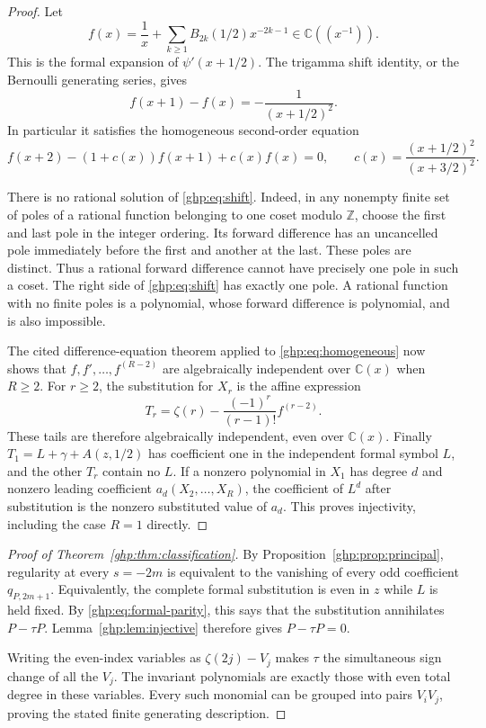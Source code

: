 \begin{proof}
Let
\begin{equation}\label{ghp:eq:formal-trigamma}
 f(x)=\frac1x+\sum_{k\geq1}B_{2k}(1/2)x^{-2k-1}
        \in\mathbb C((x^{-1})).
\end{equation}
This is the formal expansion of $\psi'(x+1/2)$. The trigamma shift
identity, or the Bernoulli generating series, gives
\begin{equation}\label{ghp:eq:shift}
 f(x+1)-f(x)=-\frac1{(x+1/2)^2}.
\end{equation}
In particular it satisfies the homogeneous second-order equation
\begin{equation}\label{ghp:eq:homogeneous}
 f(x+2)-(1+c(x))f(x+1)+c(x)f(x)=0,
 \qquad c(x)=\frac{(x+1/2)^2}{(x+3/2)^2}.
\end{equation}

There is no rational solution of \eqref{ghp:eq:shift}. Indeed, in any
nonempty finite set of poles of a rational function belonging to one
coset modulo $\mathbb Z$, choose the first and last pole in the integer
ordering. Its forward difference has an uncancelled pole immediately
before the first and another at the last. These poles are distinct.
Thus a rational forward difference cannot have precisely one pole in
such a coset. The right side of \eqref{ghp:eq:shift} has exactly one
pole. A rational function with no finite poles is a polynomial, whose
forward difference is polynomial, and is also impossible.

The cited difference-equation theorem applied to
\eqref{ghp:eq:homogeneous} now shows that
$f,f',\ldots,f^{(R-2)}$ are algebraically independent over
$\mathbb C(x)$ when $R\geq2$. For $r\geq2$, the substitution for $X_r$
is the affine expression
\[
 T_r=\zeta(r)-\frac{(-1)^r}{(r-1)!}f^{(r-2)}.
\]
These tails are therefore algebraically independent, even over
$\mathbb C(x)$. Finally $T_1=L+\gamma+A(z,1/2)$ has coefficient one
in the independent formal symbol $L$, and the other $T_r$ contain no
$L$. If a nonzero polynomial in $X_1$ has degree $d$ and nonzero leading
coefficient $a_d(X_2,\ldots,X_R)$, the coefficient of $L^d$ after
substitution is the nonzero substituted value of $a_d$. This proves
injectivity, including the case $R=1$ directly.
\end{proof}

\begin{proof}[Proof of Theorem~\ref{ghp:thm:classification}]
By Proposition~\ref{ghp:prop:principal}, regularity at every $s=-2m$
is equivalent to the vanishing of every odd coefficient $q_{P,2m+1}$.
Equivalently, the complete formal substitution is even in $z$ while
$L$ is held fixed. By \eqref{ghp:eq:formal-parity}, this says that the
substitution annihilates $P-\tau P$. Lemma~\ref{ghp:lem:injective}
therefore gives $P-\tau P=0$.

Writing the even-index variables as $\zeta(2j)-V_j$ makes $\tau$ the
simultaneous sign change of all the $V_j$. The invariant polynomials
are exactly those with even total degree in these variables. Every
such monomial can be grouped into pairs $V_iV_j$, proving the stated
finite generating description.
\end{proof}


